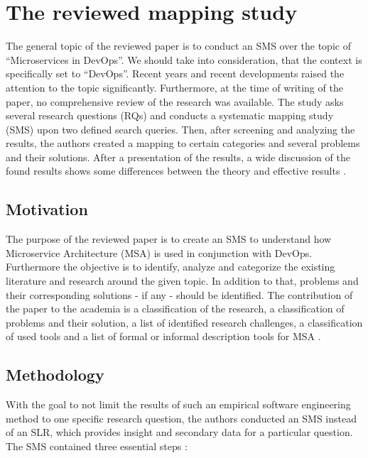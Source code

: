 \section{The reviewed mapping study}
\label{sec:summary}

The general topic of the reviewed paper is to conduct an SMS over the topic
of ``Microservices in DevOps''. We should take into consideration, that the context
is specifically set to ``DevOps''. Recent years and recent developments
raised the attention to the topic significantly. Furthermore, at the
time of writing of the paper, no comprehensive review of the research was
available. The study asks several research questions (RQs) and conducts
a systematic mapping study (SMS) upon two defined search queries. Then,
after screening and analyzing the results, the authors created a mapping
to certain categories and several problems and their solutions.
After a presentation of the results, a wide discussion of the found
results shows some differences between the theory and effective
results \cite{waseem:SMSMSADevOps}.

\subsection{Motivation}

The purpose of the reviewed paper is to create an SMS to understand how
Microservice Architecture (MSA) is used in conjunction with DevOps.
Furthermore the objective is to identify, analyze and categorize the
existing literature and research around the given topic.
In addition to that, problems and their corresponding solutions - if any - should
be identified. The contribution of the paper to the
academia is a classification of the research, a classification of problems
and their solution, a list of identified research challenges, a classification of
used tools and a list of formal or informal description
tools for MSA \cite{waseem:SMSMSADevOps}.

\subsection{Methodology}

With the goal to not limit the results of such an empirical software engineering method
to one specific research question, the authors conducted an SMS instead of an SLR,
which provides insight and secondary data for a particular question.
The SMS contained three essential steps \cite{waseem:SMSMSADevOps}:

